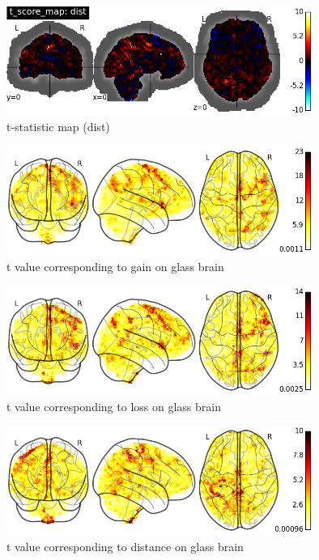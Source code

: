 \begin{figure}[h!]
\centering
\includegraphics[width=100mm]{images/t_scores_dist.png}               
\caption{t-statistic map (dist)}
\label{fig:t_dist}
\end{figure}

\begin{figure}[h!]
\centering
\includegraphics[width=100mm]{images/t_glass_brain_gain.png}               
\caption{t value corresponding to gain on glass brain}
\label{fig:t_glass1}
\end{figure}

\begin{figure}[h!]
\centering
\includegraphics[width=100mm]{images/t_glass_brain_loss.png}               
\caption{t value corresponding to loss on glass brain}
\label{fig:t_glass2}
\end{figure}

\begin{figure}[h!]
\centering
\includegraphics[width=100mm]{images/t_glass_brain_dist.png}               
\caption{t value corresponding to distance on glass brain}
\label{fig:t_glass3}
\end{figure}